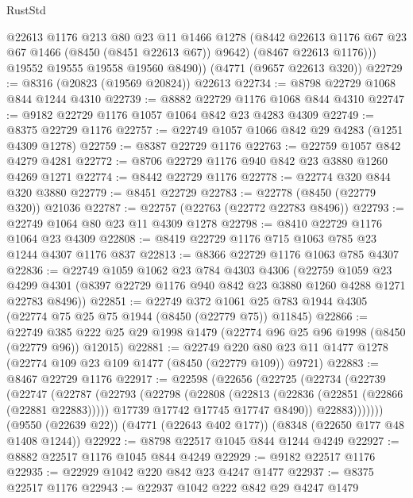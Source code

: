 \begin{lexlean}{RustStd}
\begin{coremodule}
            @22613
            @1176
            @213
            @80
            @23
            @11
            @1466
            @1278
            (@8442 @22613 @1176 @67 @23 @67 @1466 (@8450 (@8451 @22613 @67)) @9642)
            (@8467 @22613 @1176)))
        @19552
        @19555
        @19558
        @19560
        @8490))
    (@4771 (@9657 @22613 @320))
@22729 := @8316 (@20823 (@19569 @20824)) @22613
@22734 := @8798 @22729 @1068 @844 @1244 @4310
@22739 := @8882 @22729 @1176 @1068 @844 @4310
@22747 := @9182 @22729 @1176 @1057 @1064 @842 @23 @4283 @4309
@22749 := @8375 @22729 @1176
@22757 := @22749 @1057 @1066 @842 @29 @4283 (@1251 @4309 @1278)
@22759 := @8387 @22729 @1176
@22763 := @22759 @1057 @842 @4279 @4281
@22772 := @8706 @22729 @1176 @940 @842 @23 @3880 @1260 @4269 @1271
@22774 := @8442 @22729 @1176
@22778 := @22774 @320 @844 @320 @3880
@22779 := @8451 @22729
@22783 := @22778 (@8450 (@22779 @320)) @21036
@22787 := @22757 (@22763 (@22772 @22783 @8496))
@22793 := @22749 @1064 @80 @23 @11 @4309 @1278
@22798 := @8410 @22729 @1176 @1064 @23 @4309
@22808 := @8419 @22729 @1176 @715 @1063 @785 @23 @1244 @4307 @1176 @837
@22813 := @8366 @22729 @1176 @1063 @785 @4307
@22836 := @22749
    @1059
    @1062
    @23
    @784
    @4303
    @4306
    (@22759
      @1059
      @23
      @4299
      @4301
      (@8397 @22729 @1176 @940 @842 @23 @3880 @1260 @4288 @1271 @22783 @8496))
@22851 := @22749
    @372
    @1061
    @25
    @783
    @1944
    @4305
    (@22774 @75 @25 @75 @1944 (@8450 (@22779 @75)) @11845)
@22866 := @22749
    @385
    @222
    @25
    @29
    @1998
    @1479
    (@22774 @96 @25 @96 @1998 (@8450 (@22779 @96)) @12015)
@22881 := @22749
    @220
    @80
    @23
    @11
    @1477
    @1278
    (@22774 @109 @23 @109 @1477 (@8450 (@22779 @109)) @9721)
@22883 := @8467 @22729 @1176
@22917 := @22598
    (@22656
      (@22725
        (@22734
          (@22739
            (@22747
              (@22787
                (@22793
                  (@22798
                    (@22808
                      (@22813 (@22836 (@22851 (@22866 (@22881 @22883)))))
                      @17739
                      @17742
                      @17745
                      @17747
                      @8490))
                  @22883)))))))
    (@9550 (@22639 @22))
    (@4771 (@22643 @402 @177))
    (@8348 (@22650 @177 @48 @1408 @1244))
@22922 := @8798 @22517 @1045 @844 @1244 @4249
@22927 := @8882 @22517 @1176 @1045 @844 @4249
@22929 := @9182 @22517 @1176
@22935 := @22929 @1042 @220 @842 @23 @4247 @1477
@22937 := @8375 @22517 @1176
@22943 := @22937 @1042 @222 @842 @29 @4247 @1479

\end{coremodule}
\end{lexlean}
